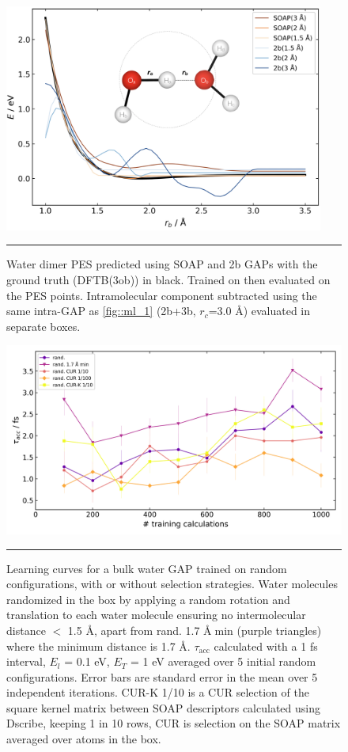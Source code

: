 \documentclass[../../main.tex]{subfiles}
\newcommand{\taua}{$\tau_\text{acc}$ }
\begin{document}
\begin{figure}[h!]
	\vspace{0.4cm}
	\centering
	\includegraphics[width=10.5cm]{6/gap/figs_si/fig3}
	\vspace{0.2cm}
	\hrule
	\caption{Water dimer PES predicted using SOAP and 2b GAPs with the ground truth (DFTB(3ob)) in black. Trained on then evaluated on the PES points. Intramolecular component subtracted using the same intra-GAP as \figurename{ \ref{fig::ml_1}} (2b+3b, $r_c$=3.0 \AA) evaluated in separate boxes.}
	\label{fig::ml_si_3}
\end{figure}


\begin{figure}[h!]
	\vspace{0.4cm}
	\centering
	\includegraphics[width=13cm]{6/gap/figs_si/fig4}
	\vspace{0.2cm}
	\hrule
	\caption{Learning curves for a bulk water GAP trained on random configurations, with or without selection strategies. Water molecules randomized in the box by applying a random rotation and translation to each water molecule ensuring no intermolecular distance $<$ 1.5 \AA, apart from rand. 1.7 \AA$\;$min (purple triangles) where the minimum distance is 1.7 \AA. \taua calculated with a 1 fs interval, $E_l$ = 0.1 eV, $E_T$ = 1 eV averaged over 5 initial random configurations. Error bars are standard error in the mean over 5 independent iterations. CUR-K 1/10 is a CUR selection of the square kernel matrix between SOAP descriptors calculated using Dscribe,\cite{Himanen2020} keeping 1 in 10 rows, CUR is selection on the SOAP matrix averaged over atoms in the box.}
	\label{fig::ml_si_4}
\end{figure}
\end{document}
